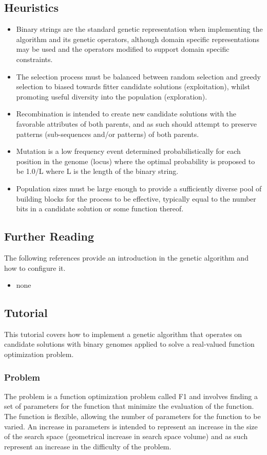 \subsection{Heuristics}
\begin{itemize}
	\item Binary strings are the standard genetic representation when implementing the algorithm and its genetic operators, although domain specific representations may be used and the operators modified to support domain specific constraints.
	\item The selection process must be balanced between random selection and greedy selection to biased towards fitter candidate solutions (exploitation), whilst promoting useful diversity into the population (exploration). 
	\item Recombination is intended to create new candidate solutions with the favorable attributes of both parents, and as such should attempt to preserve patterns (sub-sequences and/or patterns) of both parents.
	\item Mutation is a low frequency event determined probabilistically for each position in the genome (locus) where the optimal probability is proposed to be 1.0/L where L is the length of the binary string.
	\item Population sizes must be large enough to provide a sufficiently diverse pool of building blocks for the process to be effective, typically equal to the number bits in a candidate solution or some function thereof.
\end{itemize}

\subsection{Further Reading}
The following references provide an introduction in the genetic algorithm and how to configure it.

\begin{itemize}
	\item none
\end{itemize}


\subsection{Tutorial}
This tutorial covers how to implement a genetic algorithm that operates on candidate solutions with binary genomes applied to solve a real-valued function optimization problem.

\subsubsection{Problem}
The problem is a function optimization problem called F1 and involves finding a set of parameters for the function that minimize the evaluation of the function. The function is flexible, allowing the number of parameters for the function to be varied. An increase in parameters is intended to represent an increase in the size of the search space (geometrical increase in search space volume) and as such represent an increase in the difficulty of the problem.



